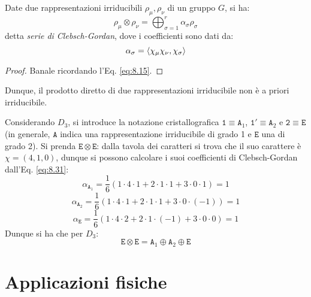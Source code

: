 \begin{proposition}
	Date due rappresentazioni irriducibili $ \rho_{\mu}, \rho_{\nu} $ di un gruppo $ G $, si ha:
	\begin{equation}
		\rho_{\mu} \otimes \rho_{\nu} = \bigoplus_{\sigma = 1}^{r} \alpha_{\sigma} \rho_{\sigma}
		\label{eq:8.30}
	\end{equation}
	detta \textit{serie di Clebsch-Gordan}, dove i coefficienti sono dati da:
	\begin{equation}
		\alpha_{\sigma} = \braket{\chi_{\mu} \chi_{\nu}, \chi_{\sigma}}
		\label{eq:8.31}
	\end{equation}
\end{proposition}
\begin{proof}
	Banale ricordando l'Eq. \ref{eq:8.15}.
\end{proof}

Dunque, il prodotto diretto di due rappresentazioni irriducibile non è a priori irriducibile.

\begin{example}
	Considerando $ D_3 $, si introduce la notazione cristallografica $ \mathtt{1} \equiv \mathtt{A}_1 $, $ \mathtt{1}' \equiv \mathtt{A}_2 $ e $ \mathtt{2} \equiv \mathtt{E} $ (in generale, $ \mathtt{A} $ indica una rappresentazione irriducibile di grado 1 e $ \mathtt{E} $ una di grado 2). Si prenda $ \mathtt{E} \otimes \mathtt{E} $: dalla tavola dei caratteri si trova che il suo carattere è $ \chi = (4,1,0) $, dunque si possono calcolare i suoi coefficienti di Clebsch-Gordan dall'Eq. \ref{eq:8.31}:
	\begin{equation*}
		\alpha_{\mathtt{A}_1} = \frac{1}{6} (1 \cdot 4 \cdot 1 + 2 \cdot 1 \cdot 1 + 3 \cdot 0 \cdot 1) = 1
	\end{equation*}
	\begin{equation*}
		\alpha_{\mathtt{A}_2} = \frac{1}{6} (1 \cdot 4 \cdot 1 + 2 \cdot 1 \cdot 1 + 3 \cdot 0 \cdot (-1)) = 1
	\end{equation*}
	\begin{equation*}
		\alpha_{\mathtt{E}} = \frac{1}{6} (1 \cdot 4 \cdot 2 + 2 \cdot 1 \cdot (-1) + 3 \cdot 0 \cdot 0) = 1
	\end{equation*}
	Dunque si ha che per $ D_3 $:
	\begin{equation*}
		\mathtt{E} \otimes \mathtt{E} = \mathtt{A}_1 \oplus \mathtt{A}_2 \oplus \mathtt{E}
	\end{equation*}
\end{example}

\section{Applicazioni fisiche}

